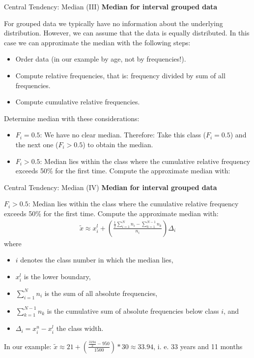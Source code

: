 \begin{frame}{Central Tendency: Median (III)}
	\textbf{Median for interval grouped data}

	For grouped data we typically have no information about the underlying
	distribution. However, we can assume that the data is equally
	distributed. In this case we can approximate the median with the following
	steps:
	\begin{itemize}
		\item Order data (in our example by age, not by frequencies!).
		\item Compute relative frequencies, that is: frequency divided by sum of all frequencies.
		\item Compute cumulative relative frequencies.
	\end{itemize}

	Determine median with these considerations:
	\begin{itemize}
		\item $F_i=0.5$: We have no clear median. Therefore: Take this class ($F_i=0.5$) and the next one ($F_i > 0.5$) to obtain the median.
		\item $F_i>0.5$: Median lies within the class where the cumulative
		      relative frequency exceeds 50\% for the first time. Compute the approximate median with:
	\end{itemize}
\end{frame}

\begin{frame}{Central Tendency: Median (IV)}
	\textbf{Median for interval grouped data}

	$F_i>0.5$: Median lies within the class where the cumulative
	relative frequency exceeds 50\% for the first time. Compute the approximate median with:
	\begin{align*}
		\tilde{x} \approx x_i^l +\left(\frac{\frac{1}{2}\sum_{i=1}^{N}n_i - \sum_{k=1}^{N-1} n_k}{n_i}\right)\Delta_i
	\end{align*}
	where
	\begin{itemize}
		\item $i$ denotes the class number in which the median lies,
		\item $x_i^l$ is the lower boundary,
		\item $\sum_{i=1}^{N}n_i$ is the sum of all absolute frequencies,
		\item $\sum_{k=1}^{N-1} n_k$ is the cumulative sum of absolute frequencies below class $i$, and
		\item $\Delta_i=x_i^u - x_i^l$ the class width.
	\end{itemize}

	In our example: $\tilde{x} \approx 21 +\left(\frac{\frac{3194}{2} - 950}{1500}\right)*30 \approx 33.94$, i. e. 33 years and 11 months
\end{frame}

